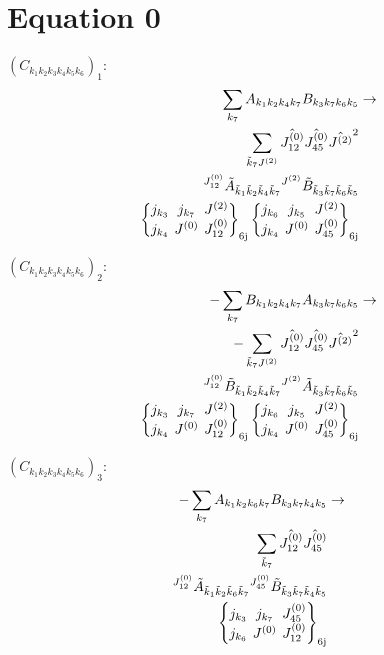 \documentclass[11pt]{article}
\newcommand{\sixj}[6]{\begingroup\setlength{\arraycolsep}{0.2em}\begin{Bmatrix} #1 & #2 & #3 \\ #4 & #5 & #6 \end{Bmatrix}_{\text{6j}}\endgroup}
\begin{document}
\section{Equation 0}
$\left({C}_{{k}_{1}{k}_{2}{k}_{3}{k}_{4}{k}_{5}{k}_{6}}\right)_{1}$:
\begin{align}
\sum_{{k}_{7}}{A}_{{k}_{1}{k}_{2}{k}_{4}{k}_{7}}{B}_{{k}_{3}{k}_{7}{k}_{6}{k}_{5}}&\rightarrow \notag \\\sum_{\tilde{k}_{7}J^{(2)}}\hat{J^{(0)}_{12}}\hat{J^{(0)}_{45}}\hat{J^{(2)}}^{2}& \notag \\{}^{J^{(0)}_{12}}\tilde{A}_{\tilde{k}_{1}\tilde{k}_{2}\tilde{k}_{4}\tilde{k}_{7}}{}^{J^{(2)}}\tilde{B}_{\tilde{k}_{3}\tilde{k}_{7}\tilde{k}_{6}\tilde{k}_{5}}& \notag \\\sixj{j_{{k}_{3}}}{j_{{k}_{7}}}{J^{(2)}}{j_{{k}_{4}}}{J^{(0)}}{J^{(0)}_{12}}\sixj{j_{{k}_{6}}}{j_{{k}_{5}}}{J^{(2)}}{j_{{k}_{4}}}{J^{(0)}}{J^{(0)}_{45}}
\end{align}

$\left({C}_{{k}_{1}{k}_{2}{k}_{3}{k}_{4}{k}_{5}{k}_{6}}\right)_{2}$:
\begin{align}
-\sum_{{k}_{7}}{B}_{{k}_{1}{k}_{2}{k}_{4}{k}_{7}}{A}_{{k}_{3}{k}_{7}{k}_{6}{k}_{5}}&\rightarrow \notag \\-\sum_{\tilde{k}_{7}J^{(2)}}\hat{J^{(0)}_{12}}\hat{J^{(0)}_{45}}\hat{J^{(2)}}^{2}& \notag \\{}^{J^{(0)}_{12}}\tilde{B}_{\tilde{k}_{1}\tilde{k}_{2}\tilde{k}_{4}\tilde{k}_{7}}{}^{J^{(2)}}\tilde{A}_{\tilde{k}_{3}\tilde{k}_{7}\tilde{k}_{6}\tilde{k}_{5}}& \notag \\\sixj{j_{{k}_{3}}}{j_{{k}_{7}}}{J^{(2)}}{j_{{k}_{4}}}{J^{(0)}}{J^{(0)}_{12}}\sixj{j_{{k}_{6}}}{j_{{k}_{5}}}{J^{(2)}}{j_{{k}_{4}}}{J^{(0)}}{J^{(0)}_{45}}
\end{align}

$\left({C}_{{k}_{1}{k}_{2}{k}_{3}{k}_{4}{k}_{5}{k}_{6}}\right)_{3}$:
\begin{align}
-\sum_{{k}_{7}}{A}_{{k}_{1}{k}_{2}{k}_{6}{k}_{7}}{B}_{{k}_{3}{k}_{7}{k}_{4}{k}_{5}}&\rightarrow \notag \\\sum_{\tilde{k}_{7}}\hat{J^{(0)}_{12}}\hat{J^{(0)}_{45}}& \notag \\{}^{J^{(0)}_{12}}\tilde{A}_{\tilde{k}_{1}\tilde{k}_{2}\tilde{k}_{6}\tilde{k}_{7}}{}^{J^{(0)}_{45}}\tilde{B}_{\tilde{k}_{3}\tilde{k}_{7}\tilde{k}_{4}\tilde{k}_{5}}& \notag \\\sixj{j_{{k}_{3}}}{j_{{k}_{7}}}{J^{(0)}_{45}}{j_{{k}_{6}}}{J^{(0)}}{J^{(0)}_{12}}
\end{align}
\end{document}

